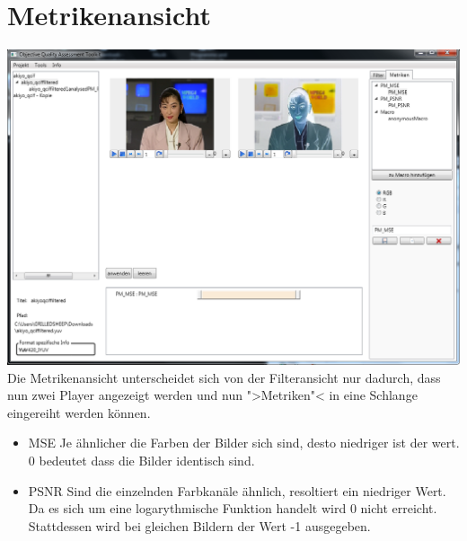 \chapter{Metrikenansicht}
\includegraphics[scale=0.55]{bilder/Metriken.png}\\[5ex]
Die Metrikenansicht unterscheidet sich von der Filteransicht nur dadurch, dass nun zwei Player angezeigt werden und nun ">Metriken"< in eine Schlange eingereiht werden können.
\begin{itemize}
\item MSE \newline
Je ähnlicher die Farben der Bilder sich sind, desto niedriger ist der wert. 0 bedeutet dass die Bilder identisch sind.
\item PSNR \newline
Sind die einzelnden Farbkanäle ähnlich, resoltiert ein niedriger Wert. Da es sich um eine logarythmische Funktion handelt wird 0 nicht erreicht. Stattdessen wird bei gleichen Bildern der Wert -1 ausgegeben.
\end{itemize}
